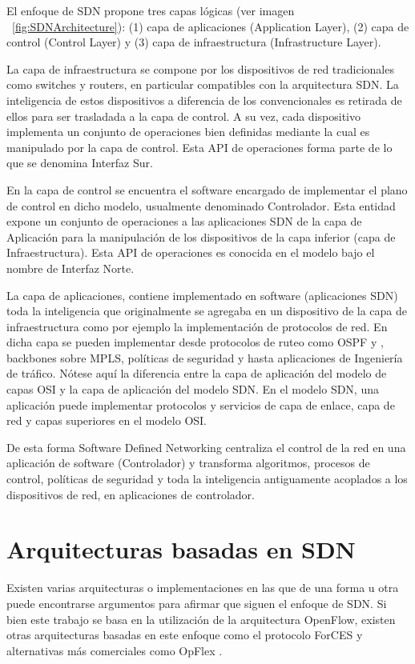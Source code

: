 El enfoque de SDN propone tres capas lógicas (ver imagen ~\ref{fig:SDNArchitecture}): (1) capa de aplicaciones (Application Layer), (2) capa de control (Control Layer) y (3) capa de infraestructura      
 (Infrastructure Layer).

La capa de infraestructura se compone por los dispositivos de red tradicionales como switches y routers, en particular compatibles con la arquitectura SDN. La inteligencia de estos dispositivos a diferencia de los convencionales es retirada de ellos para ser trasladada a la capa de control. A su vez, cada dispositivo implementa un conjunto de operaciones bien definidas mediante la cual es manipulado por la capa de control. Esta API de operaciones forma parte de lo que se denomina Interfaz Sur.

En la capa de control se encuentra el software encargado de implementar el plano de control en dicho modelo, usualmente denominado Controlador. Esta entidad expone un conjunto de operaciones a las aplicaciones SDN de la capa de Aplicación para la manipulación de los dispositivos de la capa inferior (capa de Infraestructura). Esta API de operaciones es conocida en el modelo bajo el nombre de Interfaz Norte.

La capa de aplicaciones, contiene implementado en software (aplicaciones SDN) toda la inteligencia que originalmente se agregaba en un dispositivo de la capa de infraestructura como por ejemplo la implementaci\'on de protocolos de red. En dicha capa se pueden implementar desde protocolos de ruteo como OSPF y , backbones sobre MPLS, políticas de seguridad y hasta aplicaciones de Ingeniería de tráfico. N\'otese aqu\'i la diferencia entre la capa de aplicaci\'on del modelo de capas OSI y la capa de aplicaci\'on  del modelo SDN. En el modelo SDN, una aplicaci\'on puede implementar protocolos y servicios de capa de enlace, capa de red y capas superiores en el modelo OSI.

De esta forma Software Defined Networking centraliza el control de la red en una aplicación de software (Controlador) y transforma algoritmos, procesos de control, políticas de seguridad y toda la inteligencia antiguamente acoplados a los dispositivos de red, en aplicaciones de controlador.

\section{Arquitecturas basadas en SDN}
\label{section2.3}

Existen varias arquitecturas o implementaciones en las que de una forma u otra puede encontrarse argumentos para afirmar que siguen el enfoque de SDN. Si bien este trabajo se basa en la utilización de la arquitectura OpenFlow, existen otras arquitecturas basadas en este enfoque como el protocolo ForCES y alternativas m\'as comerciales como OpFlex \cite{OpFlex}.

